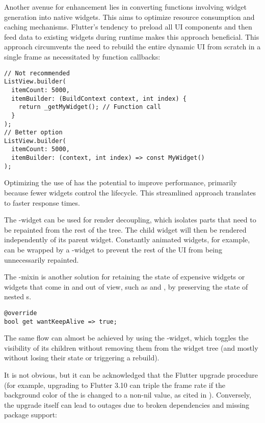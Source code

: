Another avenue for enhancement lies in converting functions involving widget generation into native widgets. This aims 
to optimize resource consumption and caching mechanisms. Flutter's tendency to preload all UI components and then feed 
data to existing widgets during runtime makes this approach beneficial. This approach circumvents the need to rebuild 
the entire dynamic UI from scratch in a single frame as necessitated by function callbacks:

\begin{lstlisting}
// Not recommended
ListView.builder(
  itemCount: 5000,
  itemBuilder: (BuildContext context, int index) {
    return _getMyWidget(); // Function call
  }
);
// Better option
ListView.builder(
  itemCount: 5000,
  itemBuilder: (context, int index) => const MyWidget()
);
\end{lstlisting}

\noindent Optimizing the use of  has the potential to improve performance, primarily because fewer 
widgets control the lifecycle. This streamlined approach translates to faster response times.

The -widget can be used for render decoupling, which isolates parts that need to be repainted from 
the rest of the tree. The child widget will then be rendered independently of its parent widget. Constantly animated 
widgets, for example, can be wrapped by a -widget to prevent the rest of the UI from being 
unnecessarily repainted.

The -mixin is another solution for retaining the state of expensive widgets or widgets 
that come in and out of view, such as  and , by preserving the state of nested 
s.

\begin{lstlisting}
@override
bool get wantKeepAlive => true;
\end{lstlisting}

\noindent The same flow can almost be achieved by using the -widget, which toggles the visibility of its 
children without removing them from the widget tree (and mostly without losing their state or triggering a rebuild).

It is not obvious, but it can be acknowledged that the Flutter upgrade procedure (for example, upgrading to Flutter 3.10 
can triple the frame rate if the background color of the  is changed to a non-nil value, as cited in 
\cite{Chis23}). Conversely, the upgrade itself can lead to outages due to broken dependencies and missing package 
support:

